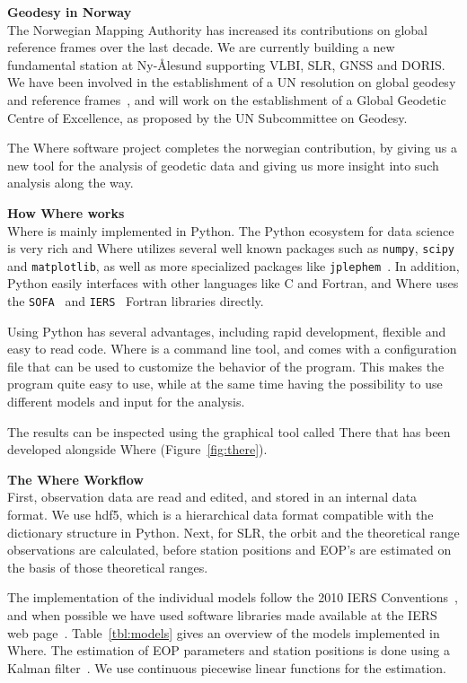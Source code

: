 
{\large\bfseries Geodesy in Norway}\\

The Norwegian Mapping Authority has increased its contributions
on global reference frames over the last decade.  We are currently building a
new fundamental station at Ny-{\AA}lesund supporting VLBI, SLR, GNSS and DORIS.
We have been involved in the establishment of a UN resolution on global geodesy
and reference frames~\cite{un_ggrf}, and will work on the establishment of a
Global Geodetic Centre of Excellence, as proposed by the UN Subcommittee on
Geodesy. 

The Where software project completes the norwegian contribution, by
giving us a new tool for the analysis of geodetic data and giving us more
insight into such analysis along the way. 


{\large\bfseries How Where works}\\

Where is mainly implemented in Python. The Python ecosystem for data science is
very rich and Where utilizes several well known packages such as
\texttt{numpy}, \texttt{scipy} and \texttt{matplotlib}, as well as more
specialized packages like \texttt{jplephem}~\cite{jplephem}. In addition,
Python easily interfaces with other languages like C and Fortran, and Where
uses the \texttt{SOFA}~\cite{sofa_software} and
\texttt{IERS}~\cite{iers_software} Fortran libraries directly.

Using Python has several advantages, including rapid development, flexible and
easy to read code. Where is a command line tool, and comes with a configuration
file that can be used to customize the behavior of the program. This makes the
program quite easy to use, while at the same time having the possibility to use
different models and input for the analysis.

The results can be inspected using the graphical tool called There that has
been developed alongside Where (Figure~\ref{fig:there}).


{\large\bfseries The Where Workflow}\\

First, observation data are read and edited, and stored in an internal data
format. We use hdf5, which is a hierarchical data format compatible with the
dictionary structure in Python. Next, for SLR, the orbit and the theoretical
range observations are calculated, before station positions and EOP's are
estimated on the basis of those theoretical ranges.

The implementation of the individual models follow the 2010 IERS
Conventions~\cite{iers2010}, and when possible we have used software libraries
made available at the IERS web page~\cite{iers_software}. Table~\ref{tbl:models}
gives an overview of the models implemented in Where. The estimation of EOP
parameters and station positions is done using a Kalman
filter~\cite{mysen2017}. We use continuous piecewise linear functions for the
estimation.


